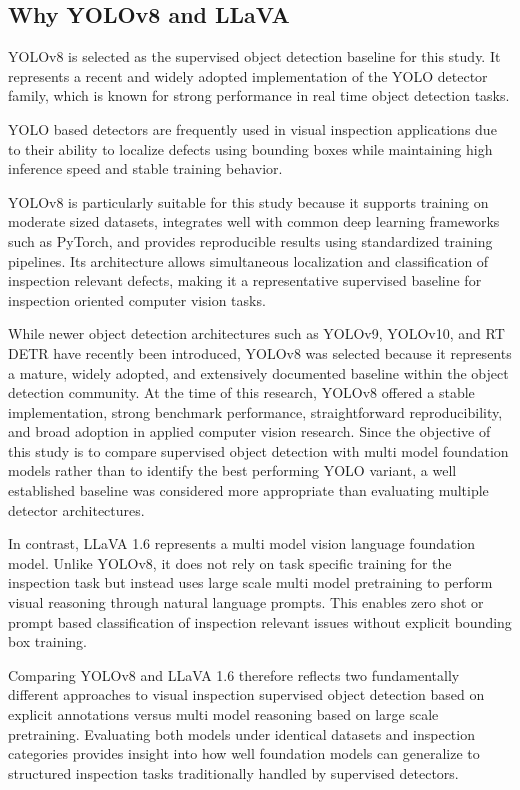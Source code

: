 \subsection{Why YOLOv8 and LLaVA}

YOLOv8 is selected as the supervised object detection baseline for this study. 
It represents a recent and widely adopted implementation of the YOLO detector family, 
which is known for strong performance in real time object detection tasks. 

YOLO based detectors are frequently used in visual inspection applications due 
to their ability to localize defects using bounding boxes while maintaining high 
inference speed and stable training behavior\cite{kang_improvement_2025,wen_autonomous_2024}.

YOLOv8 is particularly suitable for this study because it supports training on moderate sized datasets, integrates well with common deep learning frameworks such as PyTorch, and provides reproducible results using standardized training 
pipelines\cite{jocher_ultralytics_2023}. Its architecture allows simultaneous localization and classification of inspection relevant defects, making it a representative supervised baseline for inspection oriented computer vision tasks. 

While newer object detection architectures such as YOLOv9, YOLOv10, and RT DETR have recently been introduced, YOLOv8 was selected because it represents a mature, widely adopted, and extensively documented baseline within the object detection community\cite{jocher_ultralytics_2023}. At the time of this research, YOLOv8 offered a stable implementation, strong benchmark performance, straightforward reproducibility, and broad adoption in applied computer vision research. Since the objective of this study is to compare supervised object detection with multi model foundation models rather than to identify the best performing YOLO variant, a well established baseline was considered more appropriate than evaluating multiple detector architectures.

In contrast, LLaVA 1.6 represents a multi model vision language foundation model. Unlike YOLOv8, it does not rely on task specific training for the inspection task but instead uses large scale multi model pretraining to perform visual reasoning through natural language prompts\cite{liu_visual_2023}. This enables zero shot or prompt based 
classification of inspection relevant issues without explicit bounding box training. 

Comparing YOLOv8 and LLaVA 1.6 therefore reflects two fundamentally different approaches to visual inspection supervised object detection based on explicit annotations versus multi model reasoning based on large scale pretraining\cite{liu_visual_2023,jiang_mmad_2025}. Evaluating both models under identical datasets and inspection categories provides insight into how well foundation models can generalize to structured inspection tasks traditionally handled by supervised detectors.

